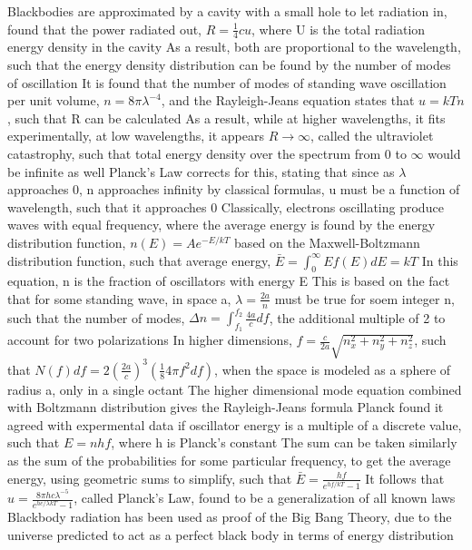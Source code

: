 \documentclass[11 pt, twoside]{article}
\newenvironment{outline*}
{
	\begin{outline}[enumerate]
	}
	{\end{outline}
}
\begin{document}
\begin{outline*}
	\2 Blackbodies are approximated by a cavity with a small hole to let radiation in, found that the power radiated out, $R = \frac{1}{4}cu$, where U is the total radiation energy density in the cavity
		\3 As a result, both are proportional to the wavelength, such that the energy density distribution can be found by the number of modes of oscillation
		\3 It is found that the number of modes of standing wave oscillation per unit volume, $n = 8\pi\lambda^{-4}$, and the Rayleigh-Jeans equation states that $u = kTn$, such that R can be calculated
		\3 As a result, while at higher wavelengths, it fits experimentally, at low wavelengths, it appears $R \to \infty$, called the ultraviolet catastrophy, such that total energy density over the spectrum from 0 to $\infty$ would be infinite as well
	\2 Planck's Law corrects for this, stating that since as $\lambda$ approaches 0, n approaches infinity by classical formulas, u must be a function of wavelength, such that it approaches 0
		\3 Classically, electrons oscillating produce waves with equal frequency, where the average energy is found by the energy distribution function, $n(E) = Ae^{-E/kT}$ based on the Maxwell-Boltzmann distribution function, such that average energy, $\bar{E} = \int^\infty_0 Ef(E)dE = kT$
			\4 In this equation, n is the fraction of oscillators with energy E
			\4 This is based on the fact that for some standing wave, in space a, $\lambda = \frac{2a}{n}$ must be true for soem integer n, such that the number of modes, $\Delta n = \int^{f_2}_{f_1} \frac{4a}{c}df$, the additional multiple of 2 to account for two polarizations
			\4 In higher dimensions, $f = \frac{c}{2a}\sqrt{n_x^2 + n_y^2 + n_z^2}$, such that $N(f)df = 2(\frac{2a}{c})^3(\frac{1}{8}4\pi f^2df)$, when the space is modeled as a sphere of radius a, only in a single octant
			\4 The higher dimensional mode equation combined with Boltzmann distribution gives the Rayleigh-Jeans formula
		\3 Planck found it agreed with expermental data if oscillator energy is a multiple of a discrete value, such that $E = nhf$, where h is Planck's constant
			\4 The sum can be taken similarly as the sum of the probabilities for some particular frequency, to get the average energy, using geometric sums to simplify, such that $\bar{E} = \frac{hf}{e^{hf/kT} - 1}$
			\4 It follows that $u = \frac{8\pi hc\lambda^{-5}}{e^{hc/\lambda kT} - 1}$, called Planck's Law, found to be a generalization of all known laws
	\2 Blackbody radiation has been used as proof of the Big Bang Theory, due to the universe predicted to act as a perfect black body in terms of energy distribution

\end{outline*}
\end{document}
